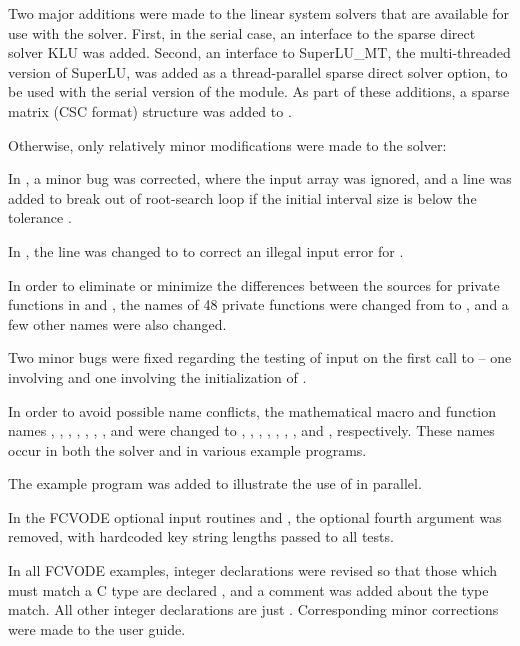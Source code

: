 Two major additions were made to the linear system solvers that are
available for use with the {\cvode} solver.  First, in the serial case,
an interface to the sparse direct solver KLU was added.
Second, an interface to SuperLU\_MT, the multi-threaded version of
SuperLU, was added as a thread-parallel sparse direct solver option,
to be used with the serial version of the {\nvector} module.
As part of these additions, a sparse matrix (CSC format) structure
was added to {\cvode}.

Otherwise, only relatively minor modifications were made to the
{\cvode} solver:

In , a minor bug was corrected, where the input
array  was ignored, and a line was added to break out of
root-search loop if the initial interval size is below the tolerance
.

In , the line  was changed to
 to correct an illegal input error for .

In order to eliminate or minimize the differences between the sources
for private functions in {\cvode} and {\cvodes}, the names of 48
private functions were changed from  to , and a few
other names were also changed.

Two minor bugs were fixed regarding the testing of input on the first
call to  -- one involving  and one involving the
initialization of .

In order to avoid possible name conflicts, the mathematical macro
and function names , , , , ,
, , and  were changed to
, , , , ,
, , and , respectively.
These names occur in both the solver and in various example programs.

The example program  was added to illustrate
the use of  in parallel.

In the FCVODE optional input routines  and ,
the optional fourth argument  was removed, with
hardcoded key string lengths passed to all  tests.

In all FCVODE examples, integer declarations were revised so that
those which must match a C type  are declared ,
and a comment was added about the type match.  All other integer
declarations are just .  Corresponding minor corrections were
made to the user guide.

